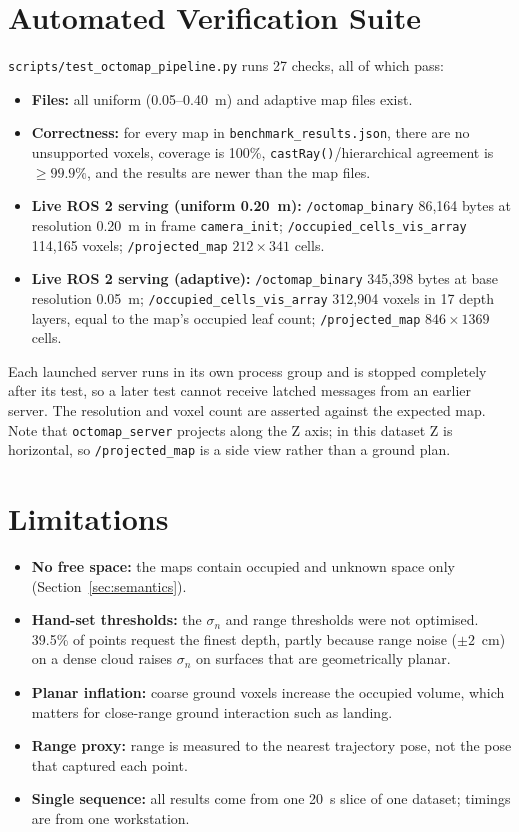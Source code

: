 \documentclass[11pt,a4paper]{report}
\begin{document}
\section{Automated Verification Suite}
\texttt{scripts/test\_octomap\_pipeline.py} runs 27 checks, all of which pass:
\begin{itemize}
    \item \textbf{Files:} all uniform (0.05--0.40~m) and adaptive map files exist.
    \item \textbf{Correctness:} for every map in \texttt{benchmark\_results.json}, there are no unsupported voxels, coverage is 100\%, \texttt{castRay()}/hierarchical agreement is $\ge 99.9\%$, and the results are newer than the map files.
    \item \textbf{Live ROS 2 serving (uniform 0.20~m):} \texttt{/octomap\_binary} 86,164 bytes at resolution 0.20~m in frame \texttt{camera\_init}; \texttt{/occupied\_cells\_vis\_array} 114,165 voxels; \texttt{/projected\_map} $212 \times 341$ cells.
    \item \textbf{Live ROS 2 serving (adaptive):} \texttt{/octomap\_binary} 345,398 bytes at base resolution 0.05~m; \texttt{/occupied\_cells\_vis\_array} 312,904 voxels in 17 depth layers, equal to the map's occupied leaf count; \texttt{/projected\_map} $846 \times 1369$ cells.
\end{itemize}
Each launched server runs in its own process group and is stopped completely after its test, so a later test cannot receive latched messages from an earlier server. The resolution and voxel count are asserted against the expected map. Note that \texttt{octomap\_server} projects along the Z axis; in this dataset Z is horizontal, so \texttt{/projected\_map} is a side view rather than a ground plan.

\section{Limitations}
\begin{itemize}
    \item \textbf{No free space:} the maps contain occupied and unknown space only (Section~\ref{sec:semantics}).
    \item \textbf{Hand-set thresholds:} the $\sigma_n$ and range thresholds were not optimised. 39.5\% of points request the finest depth, partly because range noise ($\pm 2$~cm) on a dense cloud raises $\sigma_n$ on surfaces that are geometrically planar.
    \item \textbf{Planar inflation:} coarse ground voxels increase the occupied volume, which matters for close-range ground interaction such as landing.
    \item \textbf{Range proxy:} range is measured to the nearest trajectory pose, not the pose that captured each point.
    \item \textbf{Single sequence:} all results come from one 20~s slice of one dataset; timings are from one workstation.
\end{itemize}
\end{document}
